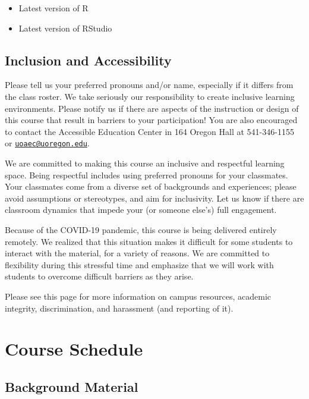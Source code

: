 \documentclass[]{book}
\begin{document}
\begin{itemize}
\item
  Latest version of R
\item
  Latest version of RStudio
\end{itemize}

\hypertarget{inclusion-and-accessibility}{%
\section{Inclusion and Accessibility}\label{inclusion-and-accessibility}}

Please tell us your preferred pronouns and/or name, especially if it differs from the class roster. We take seriously our responsibility to create inclusive learning environments. Please notify us if there are aspects of the instruction or design of this course that result in barriers to your participation! You are also encouraged to contact the Accessible Education Center in 164 Oregon Hall at 541-346-1155 or \href{mailto:uoaec@uoregon.edu}{\nolinkurl{uoaec@uoregon.edu}}.

We are committed to making this course an inclusive and respectful learning space. Being respectful includes using preferred pronouns for your classmates. Your classmates come from a diverse set of backgrounds and experiences; please avoid assumptions or stereotypes, and aim for inclusivity. Let us know if there are classroom dynamics that impede your (or someone else's) full engagement.

Because of the COVID-19 pandemic, this course is being delivered entirely remotely. We realized that this situation makes it difficult for some students to interact with the material, for a variety of reasons. We are committed to flexibility during this stressful time and emphasize that we will work with students to overcome difficult barriers as they arise.

Please see this page for more information on campus resources, academic integrity, discrimination, and harassment (and reporting of it).

\hypertarget{course-schedule}{%
\chapter{Course Schedule}\label{course-schedule}}

\hypertarget{background-material}{%
\section{Background Material}\label{background-material}}
\end{document}
